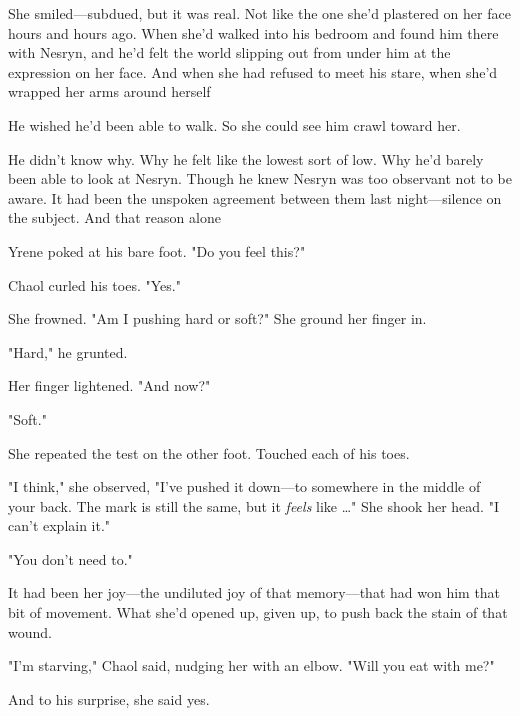 She smiled---subdued, but  it was real. Not like the one she'd plastered on her face hours and hours ago. When she'd walked into his bedroom and found him there with Nesryn, and he'd felt the world slipping out from under him at the expression on her face. And when she had refused to meet his stare, when she'd wrapped her arms around herself 

He wished he'd been able to walk. So she could see him crawl toward her.

He didn't know why. Why he felt like the lowest sort of low. Why he'd barely been able to look at Nesryn. Though he knew Nesryn was too observant not to be aware. It had been the unspoken agreement between them last night---silence on the subject. And that reason alone 

Yrene poked at his bare foot. "Do you feel this?"

Chaol curled his toes. "Yes."

She frowned. "Am I pushing hard or soft?" She ground her finger in.

"Hard," he grunted.

Her finger lightened. "And now?"

"Soft."

She repeated the test on the other foot. Touched each of his toes.

"I think," she observed, "I've pushed it down---to somewhere in the middle of your back. The mark is still the same, but it \emph{feels} like \ldots" She shook her head. "I can't explain it."

"You don't need to."

It had been her joy---the undiluted joy of that memory---that had won him that bit of movement. What she'd opened up, given up, to push back the stain of that wound.

"I'm starving," Chaol said, nudging her with an elbow. "Will you eat with me?"

And to his surprise, she said yes.

